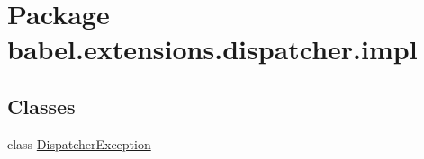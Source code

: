 \hypertarget{namespacebabel_1_1extensions_1_1dispatcher_1_1impl}{\section{Package babel.\-extensions.\-dispatcher.\-impl}
\label{namespacebabel_1_1extensions_1_1dispatcher_1_1impl}
}
\subsection*{Classes}
\begin{DoxyCompactItemize}
\item 
class \hyperlink{classbabel_1_1extensions_1_1dispatcher_1_1impl_1_1_dispatcher_exception}{Dispatcher\-Exception}
\end{DoxyCompactItemize}
